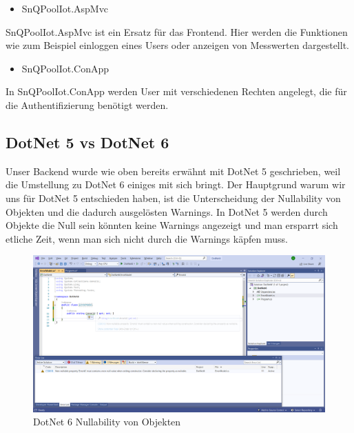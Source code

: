\begin{itemize}
    \item SnQPoolIot.AspMvc
\end{itemize}

SnQPoolIot.AspMvc ist ein Ersatz für das Frontend.
Hier werden die Funktionen wie zum Beispiel einloggen eines Users oder anzeigen von Messwerten dargestellt.

\begin{itemize}
    \item SnQPoolIot.ConApp
\end{itemize}

In SnQPoolIot.ConApp werden User mit verschiedenen Rechten angelegt, die für die Authentifizierung benötigt werden.

\subsection {DotNet 5 vs DotNet 6}

Unser Backend wurde wie oben bereits erwähnt mit DotNet 5 geschrieben, weil die Umstellung zu DotNet 6 einiges mit sich bringt.
Der Hauptgrund warum wir uns für DotNet 5 entschieden haben, ist die Unterscheidung der Nullability von Objekten und die dadurch ausgelösten Warnings.
In DotNet 5 werden durch Objekte die Null sein könnten keine Warnings angezeigt und man ersparrt sich etliche Zeit, wenn man sich nicht durch die Warnings käpfen muss.

\begin{figure}[H]
    \centering
    \includegraphics[width=1\textwidth]{pics/DotNet6Nullability.png}
    \caption{DotNet 6 Nullability von Objekten}
\end{figure}



